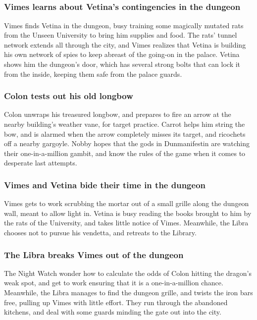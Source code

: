 \subsection{}
\subsubsection{\Gls{Vimes} learns about \Gls{Vetina}'s contingencies in the dungeon}
\Gls{Vimes} finds \Gls{Vetina} in the dungeon, busy training some magically mutated rats from the
Unseen University to bring him supplies and food. The rats' tunnel network extends all through the
city, and \Gls{Vimes} realizes that \Gls{Vetina} is building his own network of spies to keep
abreast of the going-on in the palace. \Gls{Vetina} shows him the dungeon's door, which has several
strong bolts that can lock it from the inside, keeping them safe from the palace guards.

\subsubsection{\Gls{Colon} tests out his old longbow}
\Gls{Colon} unwraps his treasured longbow, and prepares to fire an arrow at the nearby building's
weather vane, for target practice. \Gls{Carrot} helps him string the bow, and is alarmed when the
arrow completely misses its target, and ricochets off a nearby gargoyle. \Gls{Nobby} hopes that the
gods in Dunmanifestin are watching their one-in-a-million gambit, and know the rules of the game
when it comes to desperate last attempts.

\subsubsection{\Gls{Vimes} and \Gls{Vetina} bide their time in the dungeon}
\Gls{Vimes} gets to work scrubbing the mortar out of a small grille along the dungeon wall, meant
to allow light in. \Gls{Vetina} is busy reading the books brought to him by the rats of the
University, and takes little notice of \Gls{Vimes}. Meanwhile, the \Gls{Libra} chooses not to
pursue his vendetta, and retreats to the Library.

\subsubsection{The \Gls{Libra} breaks \Gls{Vimes} out of the dungeon}
The Night Watch wonder how to calculate the odds of \Gls{Colon} hitting the dragon's weak spot, and
get to work ensuring that it is a one-in-a-million chance. Meanwhile, the \Gls{Libra} manages to
find the dungeon grille, and twists the iron bars free, pulling up \Gls{Vimes} with little effort.
They run through the abandoned kitchens, and deal with some guards minding the gate out into the
city.

